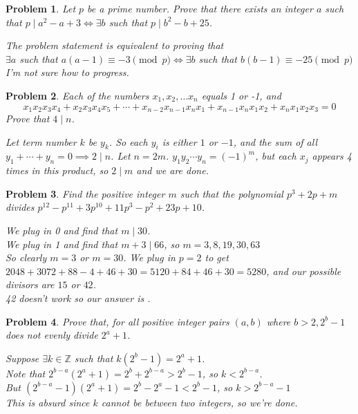 \documentclass[12pt]{scrartcl}
\newtheorem{a_problem}{Problem}
\begin{document}
\begin{a_problem}
	Let $p$ be a prime number. Prove that there exists an integer $a$ such that $p \mid a^2 - a + 3 \iff \exists b$ such that $p \mid b^2 - b + 25$.
	\begin{soln}
		The problem statement is equivalent to proving that \\
		$\exists a$ such that $a(a-1) \equiv -3 \pmod{p} \iff \exists b$ such that $b(b-1) \equiv -25 \pmod{p}$ \\
		I'm not sure how to progress.
	\end{soln}
\end{a_problem}

\begin{a_problem}
	Each of the numbers $x_1, x_2,\dots x_n$ equals 1 or -1, and
	\[x_1x_2x_3x_4 + x_2x_3x_4x_5 + \cdots + x_{n-2}x_{n-1}x_{n}x_1 + x_{n-1}x_{n}x_1x_2 + x_{n}x_1x_2x_3 = 0\]
	Prove that $4 \mid n$.
	\begin{soln}
		Let term number $k$ be $y_k$. So each $y_i$ is either $1$ or $-1$, and the sum of all $y_1 + \cdots + y_n = 0 \implies 2 \mid n$. Let $n=2m$. $y_1 y_2 \cdots y_n = {\left(-1\right)}^m$, but each $x_j$ appears 4 times in this product, so $2 \mid m$ and we are done.
	\end{soln}
\end{a_problem}

\setcounter{a_problem}{397}
\begin{a_problem}
Find the positive integer $m$ such that the polynomial $p^3 + 2p + m$ divides $p^{12} - p^{11} + 3p^{10} + 11p^3 - p^2 + 23p + 10$.
	\begin{soln}
		We plug in 0 and find that $m \mid 30$. \\
		We plug in 1 and find that $m + 3 \mid 66$, so $m = 3,8,19,30,63$ \\
		So clearly $m = 3$ or $m = 30$.
		We plug in $p=2$ to get $2048 + 3072 + 88 - 4 + 46 + 30 = 5120 + 84 + 46 + 30 = 5280$, and our possible divisors are $15$ or $42$. \\
		42 doesn't work so our answer is .
	\end{soln}
\end{a_problem}
\begin{a_problem}
	Prove that, for all positive integer pairs $(a,b)$ where $b>2, 2^b - 1$ does not evenly divide $2^a + 1$.
	\begin{soln}
		Suppose $\exists k \in \mathbb{Z}$ such that $k(2^b - 1) = 2^a + 1$. \\
		Note that $2^{b-a}\left( 2^a +1\right) = 2^b + 2^{b-a} > 2^b - 1$, so $k < 2^{b-a}$. \\
		But $\left(2^{b-a} - 1\right)\left(2^a + 1\right) = 2^b - 2^a - 1 < 2^b - 1$, so $k > 2^{b-a}-1$ \\
		This is absurd since $k$ cannot be between two integers, so we're done.

	\end{soln}
\end{a_problem}
\end{document}
